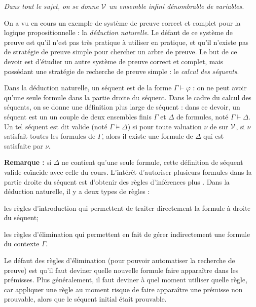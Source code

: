 \documentclass[a4paper,french,bookmarks]{article}
\begin{document}
    \renewcommand{\thesection}{\Roman{section}} 
    \renewcommand{\thesubsection}{\thesection.\Alph{subsection}}
    \renewcommand{\labelenumi}{\thesection.\arabic{enumi}.}
    \renewcommand*{\labelenumii}{\alph{enumii}.}
    
    
    \emph{Dans tout le sujet, on se donne $\mathcal{V}$ un ensemble infini dénombrable de variables.}\bigskip
    
    On a vu en cours un exemple de système de preuve correct et complet pour la logique propositionnelle : la \emph{déduction naturelle}. Le défaut de ce système de preuve est qu'il n'est pas très pratique à utiliser en pratique, et qu'il n'existe pas de stratégie de preuve simple pour chercher un arbre de preuve. Le but de ce devoir est d'étudier un autre système de preuve correct et complet, mais possédant une stratégie de recherche de preuve simple : le \emph{calcul des séquents}.\medskip
    
    Dans la déduction naturelle, un séquent est de la forme $\Gamma \vdash \varphi$ : on ne peut avoir qu'une seule formule dans la partie droite du séquent. Dans le cadre du calcul des séquents, on se donne une définition plus large de séquent : dans ce devoir, un séquent est un un couple de deux ensembles finis $\Gamma$ et $\Delta$ de formules, noté $\Gamma \vdash \Delta$. Un tel séquent est dit valide (noté $\Gamma \vDash \Delta$) si pour toute valuation $\nu$ de sur $\mathcal{V}$, si $\nu$ satisfait toutes les formules de $\Gamma$, alors il existe une formule de $\Delta$ qui est satisfaite par $\nu$.\bigskip
    
    \textbf{\sffamily Remarque :} si $\Delta$ ne contient qu'une seule formule, cette définition de séquent valide coïncide avec celle du cours. L'intérêt d'autoriser plusieurs formules dans la partie droite du séquent est d'obtenir des règles d'inférences plus . Dans la déduction naturelle, il y a deux types de règles : 
    \begin{enumerate}
        \itt les règles d'introduction qui permettent de traiter directement la formule à droite du séquent;
        
        \itt les règles d'élimination qui permettent en fait de gérer indirectement une formule du contexte $\Gamma$.
    \end{enumerate}
    Le défaut des règles d'élimination (pour pouvoir automatiser la recherche de preuve) est qu'il faut deviner quelle nouvelle formule faire apparaître dans les prémisses. Plus généralement, il faut deviner à quel moment utiliser quelle règle, car appliquer une règle au  moment risque de faire apparaître une prémisse non prouvable, alors que le séquent initial était prouvable.\medskip
    
\end{document}
